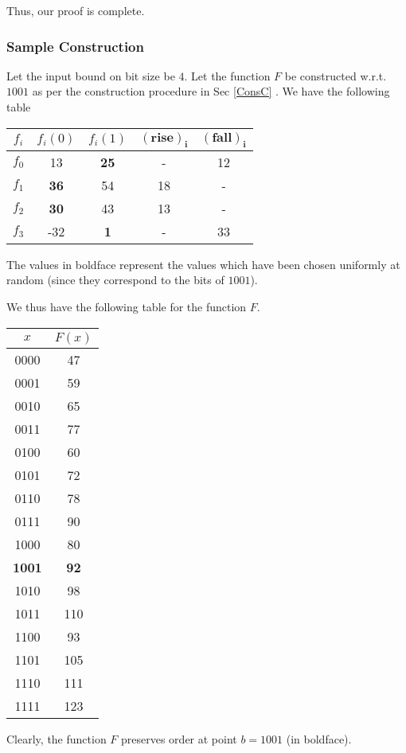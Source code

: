 \documentclass[11pt, letterpaper, romanappendices, onecolumn]{article}
\theoremstyle{plain}\newtheorem{thm}{Theorem}[section]
\theoremstyle{definition}
\theoremstyle{remark}
\begin{document}
Thus, our proof is complete.

\subsubsection{Sample Construction}
\par Let the input bound on bit size be $4$. Let the function $F$ be constructed w.r.t. $1001$ as per the construction procedure in Sec \ref{ConsC} . We have the following table
\begin{center}
	\begin{tabular}{|c|c|c|c|c|}\hline
	$f_i$ & $f_i(0)$ & $f_i(1)$ & $\mathbf{(rise)_i}$ & $\mathbf{(fall)_i}$\\\hline
	$f_0$ & 13 & \textbf{25} & - & 12 \\\hline
	$f_1$ & \textbf{36} & 54 & 18 & - \\\hline
	$f_2$ & \textbf{30} & 43 & 13 & - \\\hline
	$f_3$ & -32 & \textbf{1} & - & 33 \\\hline 
	\end{tabular}
\end{center}
The values in boldface represent the values which have been chosen uniformly at random (since they correspond to the bits of $1001$).

\par We thus have the following table for the function $F$.
\begin{center}
\begin{tabular}{|c|c|}
\hline 
$x$ & $F(x)$ \\ 
\hline 
0000 & 47 \\ 
\hline 
0001 & 59 \\ 
\hline 
0010 & 65 \\ 
\hline 
0011 & 77 \\ 
\hline 
0100 & 60 \\ 
\hline 
0101 & 72 \\ 
\hline 
0110 & 78 \\ 
\hline 
0111 & 90 \\ 
\hline 
1000 & 80 \\ 
\hline 
\textbf{1001} &\textbf{ 92} \\ 
\hline 
1010 & 98 \\ 
\hline 
1011 & 110 \\ 
\hline 
1100 & 93 \\ 
\hline 
1101 & 105 \\ 
\hline 
1110 & 111 \\ 
\hline 
1111 & 123 \\ 
\hline 
\end{tabular}
\end{center}
Clearly, the function $F$ preserves order at point $b = 1001$ (in boldface). 
\end{document}
